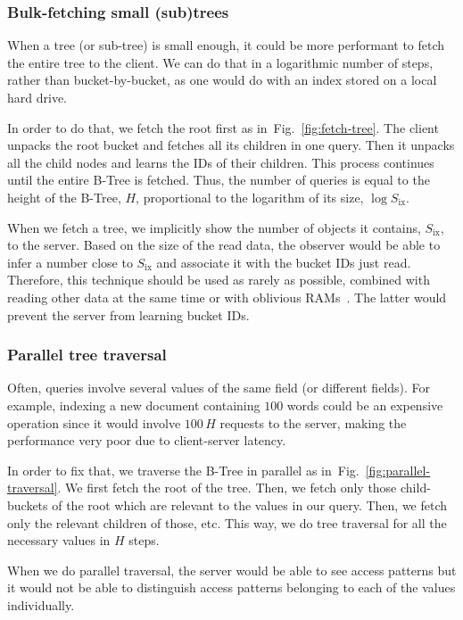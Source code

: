 \documentclass[notitlepage,longbibliography]{revtex4-1}
\newcommand{\figref}[1]{Fig.~\ref{#1}}
\begin{document}
\subsubsection{Bulk-fetching small (sub)trees}
\label{sec:bulk-fetching}

When a tree (or sub-tree) is small enough, it could be more performant to fetch the entire tree to the client.
We can do that in a logarithmic number of steps, rather than bucket-by-bucket, as one would do with an index stored on a local hard drive.

In order to do that, we fetch the root first as in~\figref{fig:fetch-tree}.
The client unpacks the root bucket and fetches all its children in one query.
Then it unpacks all the child nodes and learns the IDs of their children.
This process continues until the entire B-Tree is fetched.
Thus, the number of queries is equal to the height of the B-Tree, $H$, proportional to the logarithm of its size, $\log{S_{\mbox{ix}}}$.

When we fetch a tree, we implicitly show the number of objects it contains, $S_{\mbox{ix}}$, to the server.
Based on the size of the read data, the observer would be able to infer a number close to $S_{\mbox{ix}}$ and associate it with the bucket IDs just read.
Therefore, this technique should be used as rarely as possible, combined with reading other data at the same time or with oblivious RAMs~\cite{path-oram,burst-oram,oram-multicloud,ods-wang-2014}.
The latter would prevent the server from learning bucket IDs.

\subsubsection{Parallel tree traversal}
\label{sec:parallel-traversal}

Often, queries involve several values of the same field (or different fields).
For example, indexing a new document containing $100$ words could be an expensive operation since it would involve $100\,H$ requests to the server,
making the performance very poor due to client-server latency.

In order to fix that, we traverse the B-Tree in parallel as in~\figref{fig:parallel-traversal}.
We first fetch the root of the tree.
Then, we fetch only those child-buckets of the root which are relevant to the values in our query.
Then, we fetch only the relevant children of those, etc.
This way, we do tree traversal for all the necessary values in $H$ steps.

When we do parallel traversal, the server would be able to see access patterns but it would not be able to distinguish access patterns belonging to each of the values individually.
\end{document}
